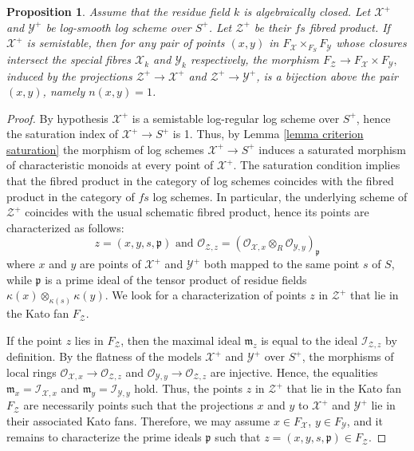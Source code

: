 \documentclass{amsart}%
\numberwithin{equation}{subsection}
\theoremstyle{plain2}
\newtheorem{prop}[equation]{Proposition}
\theoremstyle{definition2}
\theoremstyle{stepstyle}
\theoremstyle{point}
\theoremstyle{subpoint}
\newcommand{\cX}{\ensuremath{\mathscr{X}}}
\newcommand{\fp}{\ensuremath{\mathfrak{p}}}
\newcommand{\caO}{\ensuremath{\mathcal{O}}}
\newcommand{\caI}{\ensuremath{\mathcal{I}}}
\newcommand{\cY}{\ensuremath{\mathscr{Y}}}
\newcommand{\cZ}{\ensuremath{\mathscr{Z}}}
\renewcommand{\cZ}{\ensuremath{\mathscr{Z}}}
\renewcommand{\cY}{\ensuremath{\mathscr{Y}}}
\begin{document}
\begin{prop} \label{prop semistability and iso Kato fans}
Assume that the residue field $k$ is algebraically closed. Let $\cX^+$ and $\cY^+$ be log-smooth log scheme over $S^+$. Let $\cZ^+$ be their $fs$ fibred product. If $\cX^+$ is semistable, then for any pair of points $(x,y)$ in $F_\cX \times_{F_S} F_\cY$ whose closures intersect the special fibres $\cX_k$ and $\cY_k$ respectively, the morphism $F_{\cZ}\xrightarrow{} F_{\cX} \times F_{\cY},$ induced by the projections $\cZ^+ \rightarrow \cX^+$ and $\cZ^+ \rightarrow \cY^+$, is a bijection above the pair $(x,y)$, namely $n(x,y)=1$.
\end{prop}

\begin{proof}
By hypothesis $\cX^+$ is a semistable log-regular log scheme over $S^+$, hence the saturation index of $\cX^+ \rightarrow S^+$ is 1. Thus, by Lemma \ref{lemma criterion saturation} the morphism of log schemes $\cX^+ \rightarrow S^+$ induces a saturated morphism of characteristic monoids at every point of $\cX^+$. The saturation condition implies that the fibred product in the category of log schemes coincides with the fibred product in the category of $fs$ log schemes. In particular, the underlying scheme of $\cZ^+$ coincides with the usual schematic fibred product, hence its points are characterized as follows:$$z=(x,y,s,\fp) \text{ and } \caO_{\cZ,z}=(\caO_{\cX,x} \otimes_R \caO_{\cY,y})_{\fp}$$ where $x$ and $y$ are points of $\cX^+$ and $\cY^+$ both mapped to the same point $s$ of $S$, while $\fp$ is a prime ideal of the tensor product of residue fields $\kappa(x) \otimes_{\kappa(s)} \kappa(y)$. We look for a characterization of points $z$ in $\cZ^+$ that lie in the Kato fan $F_{\cZ}$.

If the point $z$ lies in $F_{\cZ}$, then the maximal ideal $\mathfrak{m}_z$ is equal to the ideal $\caI_{\cZ,z}$ by definition. By the flatness of the models $\cX^+$ and $\cY^+$ over $S^+$, the morphisms of local rings $\caO_{\cX,x} \rightarrow \caO_{\cZ,z}$ and $\caO_{\cY,y} \rightarrow \caO_{\cZ,z}$ are injective. Hence, the equalities $\mathfrak{m}_x= \caI_{\cX,x}$ and $\mathfrak{m}_y= \caI_{\cY,y}$ hold. Thus, the points $z$ in $\cZ^+$ that lie in the Kato fan $F_{\cZ}$ are necessarily points such that the projections $x$ and $y$ to $\cX^+$ and $\cY^+$ lie in their associated Kato fans. Therefore, we may assume $x \in F_{\cX}$, $y \in F_{\cY}$, and it remains to characterize the prime ideals $\fp$ such that $z=(x,y,s,\fp) \in F_{\cZ}$.


\end{proof}
\end{document}
